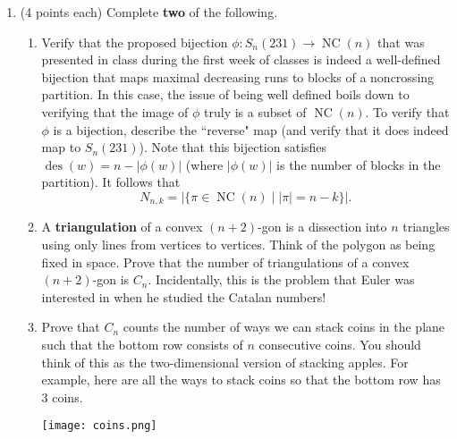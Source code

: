 \documentclass[11pt]{article}
\theoremstyle{definition}
\DeclareMathOperator{\des}{des}
\DeclareMathOperator{\SYT}{SYT}
\DeclareMathOperator{\NC}{NC}
\begin{document}
\begin{enumerate}
\item (4 points each) Complete \textbf{two} of the following.
\begin{enumerate}

\item Verify that the proposed bijection $\phi:S_n(231)\to \NC(n)$ that was presented in class during the first week of classes is indeed a well-defined bijection that maps maximal decreasing runs to blocks of a noncrossing partition. In this case, the issue of being well defined boils down to verifying that the image of $\phi$ truly is a subset of $\NC(n)$.  To verify that $\phi$ is a bijection, describe the ``reverse" map (and verify that it does indeed map to $S_n(231)$).  Note that this bijection satisfies $\des(w)=n-|\phi(w)|$ (where $|\phi(w)|$ is the number of blocks in the partition). It follows that
\[
N_{n,k}=|\{\pi\in\NC(n)\mid |\pi|=n-k\}|.
\]


\item A \textbf{triangulation} of a convex $(n+2)$-gon is a dissection into $n$ triangles using only lines from vertices to vertices. Think of the polygon as being fixed in space. Prove that the number of triangulations of a convex $(n+2)$-gon is $C_n$. Incidentally, this is the problem that Euler was interested in when he studied the Catalan numbers!


\item Prove that $C_n$ counts the number of ways we can stack coins in the plane such that the bottom row consists of $n$ consecutive coins.  You should think of this as the two-dimensional version of stacking apples.  For example, here are all the ways to stack coins so that the bottom row has 3 coins.
\begin{center}
\texttt{[image: coins.png]}
\end{center}


\end{enumerate}
\end{enumerate}
\end{document}
